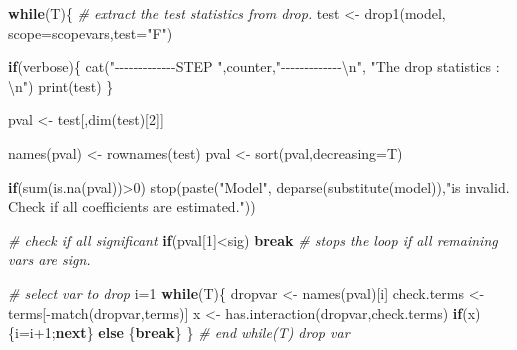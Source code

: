 \documentclass[
]{article}
\newenvironment{Shaded}{\begin{snugshade}}{\end{snugshade}}
\newcommand{\AttributeTok}[1]{\textcolor[rgb]{0.77,0.63,0.00}{#1}}
\newcommand{\CommentTok}[1]{\textcolor[rgb]{0.56,0.35,0.01}{\textit{#1}}}
\newcommand{\ControlFlowTok}[1]{\textcolor[rgb]{0.13,0.29,0.53}{\textbf{#1}}}
\newcommand{\DecValTok}[1]{\textcolor[rgb]{0.00,0.00,0.81}{#1}}
\newcommand{\FunctionTok}[1]{\textcolor[rgb]{0.00,0.00,0.00}{#1}}
\newcommand{\NormalTok}[1]{#1}
\newcommand{\OtherTok}[1]{\textcolor[rgb]{0.56,0.35,0.01}{#1}}
\newcommand{\SpecialCharTok}[1]{\textcolor[rgb]{0.00,0.00,0.00}{#1}}
\newcommand{\StringTok}[1]{\textcolor[rgb]{0.31,0.60,0.02}{#1}}
\begin{document}
\begin{Shaded}
\begin{Highlighting}[]
  \ControlFlowTok{while}\NormalTok{(T)\{}
    \CommentTok{\# extract the test statistics from drop.}
\NormalTok{    test }\OtherTok{\textless{}{-}} \FunctionTok{drop1}\NormalTok{(model, }\AttributeTok{scope=}\NormalTok{scopevars,}\AttributeTok{test=}\StringTok{"F"}\NormalTok{)}
    
    \ControlFlowTok{if}\NormalTok{(verbose)\{}
      \FunctionTok{cat}\NormalTok{(}\StringTok{"{-}{-}{-}{-}{-}{-}{-}{-}{-}{-}{-}{-}{-}STEP "}\NormalTok{,counter,}\StringTok{"{-}{-}{-}{-}{-}{-}{-}{-}{-}{-}{-}{-}{-}}\SpecialCharTok{\textbackslash{}n}\StringTok{"}\NormalTok{,}
          \StringTok{"The drop statistics : }\SpecialCharTok{\textbackslash{}n}\StringTok{"}\NormalTok{)}
      \FunctionTok{print}\NormalTok{(test)}
\NormalTok{    \}}
    
\NormalTok{    pval }\OtherTok{\textless{}{-}}\NormalTok{ test[,}\FunctionTok{dim}\NormalTok{(test)[}\DecValTok{2}\NormalTok{]]}
    
    \FunctionTok{names}\NormalTok{(pval) }\OtherTok{\textless{}{-}} \FunctionTok{rownames}\NormalTok{(test)}
\NormalTok{    pval }\OtherTok{\textless{}{-}} \FunctionTok{sort}\NormalTok{(pval,}\AttributeTok{decreasing=}\NormalTok{T)}
    
    \ControlFlowTok{if}\NormalTok{(}\FunctionTok{sum}\NormalTok{(}\FunctionTok{is.na}\NormalTok{(pval))}\SpecialCharTok{\textgreater{}}\DecValTok{0}\NormalTok{) }\FunctionTok{stop}\NormalTok{(}\FunctionTok{paste}\NormalTok{(}\StringTok{"Model"}\NormalTok{,}
                                      \FunctionTok{deparse}\NormalTok{(}\FunctionTok{substitute}\NormalTok{(model)),}\StringTok{"is invalid. Check if all coefficients are estimated."}\NormalTok{))}
    
    \CommentTok{\# check if all significant}
    \ControlFlowTok{if}\NormalTok{(pval[}\DecValTok{1}\NormalTok{]}\SpecialCharTok{\textless{}}\NormalTok{sig) }\ControlFlowTok{break} \CommentTok{\# stops the loop if all remaining vars are sign.}
    
    \CommentTok{\# select var to drop}
\NormalTok{    i}\OtherTok{=}\DecValTok{1}
    \ControlFlowTok{while}\NormalTok{(T)\{}
\NormalTok{      dropvar }\OtherTok{\textless{}{-}} \FunctionTok{names}\NormalTok{(pval)[i]}
\NormalTok{      check.terms }\OtherTok{\textless{}{-}}\NormalTok{ terms[}\SpecialCharTok{{-}}\FunctionTok{match}\NormalTok{(dropvar,terms)]}
\NormalTok{      x }\OtherTok{\textless{}{-}} \FunctionTok{has.interaction}\NormalTok{(dropvar,check.terms)}
      \ControlFlowTok{if}\NormalTok{(x)\{i}\OtherTok{=}\NormalTok{i}\SpecialCharTok{+}\DecValTok{1}\NormalTok{;}\ControlFlowTok{next}\NormalTok{\} }\ControlFlowTok{else}\NormalTok{ \{}\ControlFlowTok{break}\NormalTok{\}              }
\NormalTok{    \} }\CommentTok{\# end while(T) drop var}
    

\end{Highlighting}
\end{Shaded}
\end{document}
